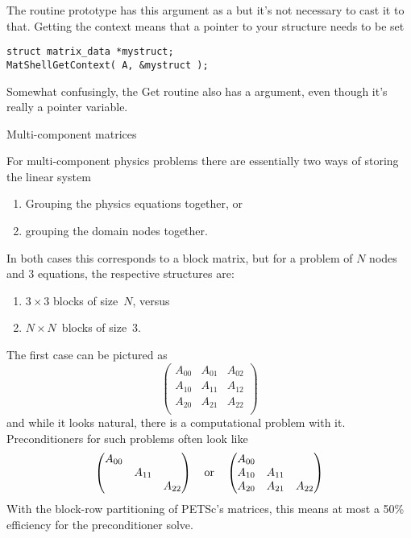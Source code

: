 The routine prototype
has this argument as a  but it's not necessary to
cast it to that. Getting the context means that a pointer to your
structure needs to be set
\begin{lstlisting}
struct matrix_data *mystruct;
MatShellGetContext( A, &mystruct );
\end{lstlisting}
Somewhat confusingly, the Get routine also has a 
argument, even though it's really a pointer variable.

 {Multi-component matrices}
\label{sec:matfieldsplit}

For multi-component physics problems there are essentially
two ways of storing the linear system
\begin{enumerate}
\item Grouping the physics equations together, or
\item grouping the domain nodes together.
\end{enumerate}
In both cases this corresponds to a block matrix, but
for a problem of $N$ nodes and $3$ equations, the
respective structures are:
\begin{enumerate}
\item $3\times 3 $ blocks of size~$N$, versus
\item $N\times N$~blocks of size~$3$.
\end{enumerate}
The first case can be pictured as
\[ 
\begin{pmatrix}
  A_{00}&A_{01}&A_{02}\\ A_{10}&A_{11}&A_{12}\\ A_{20}&A_{21}&A_{22}\\ 
\end{pmatrix}
\]
and while it looks natural, there is a computational problem with it.
Preconditioners for such problems often look like
\[ 
\begin{pmatrix}
  A_{00}&\\ &A_{11}&\\ &&A_{22}\\ 
\end{pmatrix}
\quad\hbox{or}\quad
\begin{pmatrix}
  A_{00}&&\\ A_{10}&A_{11}&\\ A_{20}&A_{21}&A_{22}\\ 
\end{pmatrix}
\]
With the block-row partitioning of PETSc's matrices, this means
at most a 50\% efficiency for the preconditioner solve.

